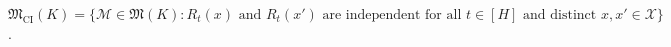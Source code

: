 \(\mathfrak M_{\mathrm{CI}}(K)=\{\mathcal M\in\mathfrak M(K):R_t(x)\text{ and }R_t(x')\text{ are independent for all }t\in[H]\text{ and distinct }x,x'\in\mathcal X\}\).